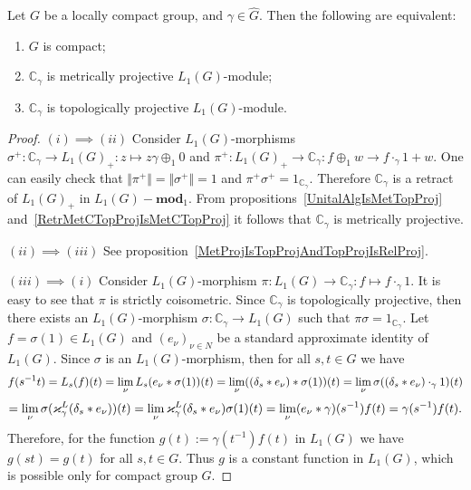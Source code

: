 \begin{proposition}\label{OneDimL1ModMetTopProjCharac} Let $G$ be a locally 
compact group, and $\gamma\in\widehat{G}$. Then the following are equivalent:

\begin{enumerate}[label = (\roman*)]
    \item $G$ is compact;

    \item $\mathbb{C}_\gamma$ is metrically projective $L_1(G)$-module;

    \item $\mathbb{C}_\gamma$ is topologically projective $L_1(G)$-module.
\end{enumerate}
\end{proposition}
\begin{proof} $(i)\implies (ii)$ Consider $L_1(G)$-morphisms 
$\sigma^+:\mathbb{C}_\gamma\to {L_1(G)}_+:z\mapsto z\gamma \oplus_1 0$ 
and $\pi^+:{L_1(G)}_+\to\mathbb{C}_\gamma: f\oplus_1 w\to f\cdot_{\gamma}1+w$. 
One can easily check 
that $\Vert\pi^+\Vert=\Vert\sigma^+\Vert=1$ 
and $\pi^+\sigma^+=1_{\mathbb{C}_\gamma}$. Therefore $\mathbb{C}_\gamma$ is a 
retract of ${L_1(G)}_+$ in $L_1(G)-\mathbf{mod}_1$. From 
propositions~\ref{UnitalAlgIsMetTopProj} 
and~\ref{RetrMetCTopProjIsMetCTopProj} it follows 
that $\mathbb{C}_\gamma$ is metrically projective.

$(ii)\implies (iii)$ See
proposition~\ref{MetProjIsTopProjAndTopProjIsRelProj}.

$(iii)\implies (i)$ Consider $L_1(G)$-morphism
$\pi:L_1(G)\to\mathbb{C}_\gamma:f\mapsto f\cdot_{\gamma} 1$. It is easy to see
that $\pi$ is strictly coisometric. Since $\mathbb{C}_\gamma$ is topologically
projective, then there exists an $L_1(G)$-morphism $\sigma:\mathbb{C}_\gamma\to
L_1(G)$ such that $\pi\sigma=1_{\mathbb{C}_\gamma}$. Let $f=\sigma(1)\in L_1(G)$
and ${(e_\nu)}_{\nu\in N}$ be a standard approximate identity of $L_1(G)$. Since
$\sigma$ is an $L_1(G)$-morphism, then for all $s,t\in G$ we have 
$$
f(s^{-1}t)
=L_s(f)(t)
=\lim_\nu L_s(e_\nu\ast \sigma(1))(t)
=\lim_\nu((\delta_s\ast e_\nu)\ast \sigma(1))(t)
=\lim_\nu\sigma((\delta_s\ast e_\nu)\cdot_{\gamma} 1)(t)
$$
$$
=\lim_\nu\sigma(\varkappa_\gamma^L(\delta_s\ast e_\nu))(t)
=\lim_\nu\varkappa_\gamma^L(\delta_s\ast e_\nu)\sigma(1)(t)
=\lim_\nu(e_\nu\ast\gamma)(s^{-1})f(t)
=\gamma(s^{-1})f(t).
$$
Therefore, for the function $g(t):=\gamma(t^{-1})f(t)$ in $L_1(G)$ we have
$g(st)=g(t)$ for all $s,t\in G$. Thus $g$ is a constant function in $L_1(G)$,
which is possible only for compact group $G$.
\end{proof}

